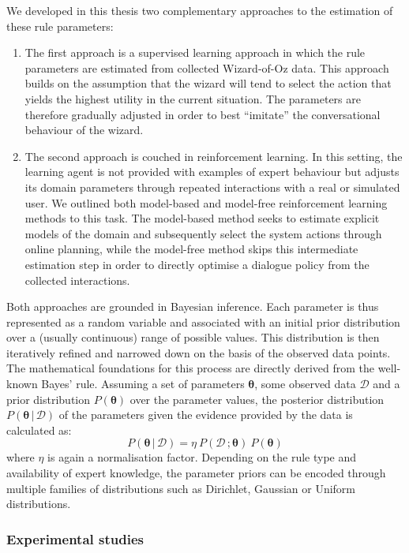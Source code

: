 We developed in this thesis two complementary approaches to the estimation of these rule parameters:
\begin{enumerate}
\item The first approach is a supervised learning approach in which the rule parameters are estimated from collected Wizard-of-Oz data.  This approach builds on the assumption that the wizard will tend to select the action that yields the highest utility in the current situation. The parameters are therefore gradually adjusted in order to best ``imitate'' the conversational behaviour of the wizard.
\item The second approach is couched in reinforcement learning.  In this setting, the learning agent is not provided with examples of expert behaviour but adjusts its domain parameters through repeated interactions with a real or simulated user. We outlined both model-based and model-free reinforcement learning methods to this task.  The model-based method seeks to estimate explicit models of the domain and subsequently select the system actions through online planning, while the model-free method skips this intermediate estimation step in order to directly optimise a dialogue policy from the collected interactions.
\end{enumerate}

Both approaches are grounded in Bayesian inference.  Each parameter is thus represented as a random variable and associated with an initial prior distribution over a (usually continuous) range of possible values. This distribution is then iteratively refined and narrowed down on the basis of the observed data points. The mathematical foundations for this process are directly derived from the well-known Bayes' rule. Assuming a set of parameters $\boldsymbol\theta$, some observed data $\mathcal{D}$ and a prior distribution $P(\boldsymbol\theta)$ over the parameter values, the posterior distribution $P(\boldsymbol\theta \, | \, \mathcal{D})$ of the parameters given the evidence provided by the data is calculated as:
\begin{equation}
P(\boldsymbol\theta \, | \, \mathcal{D}) = \eta \ P(\mathcal{D} \,; \boldsymbol\theta) \ P(\boldsymbol\theta)
\end{equation}
where $\eta$ is again a normalisation factor. Depending on the rule type and availability of expert knowledge, the parameter priors can be encoded through multiple families of distributions such as Dirichlet, Gaussian or Uniform distributions. 

\subsubsection*{Experimental studies}

